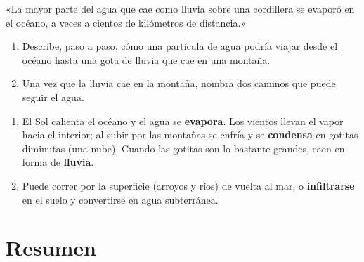 \begin{exercise}
    «La mayor parte del agua que cae como lluvia sobre una cordillera se evaporó en el océano, a veces a cientos de kilómetros de distancia.»
    \begin{enumerate}[label=\letraminuscula]
        \item Describe, paso a paso, cómo una partícula de agua podría viajar desde el océano hasta una gota de lluvia que cae en una montaña.
        \item Una vez que la lluvia cae en la montaña, nombra dos caminos que puede seguir el agua.
    \end{enumerate}
    \begin{solu}
        \begin{enumerate}[label=\alph*)]
            \item El Sol calienta el océano y el agua se \textbf{evapora}. Los vientos llevan el vapor hacia el interior; al subir por las montañas se enfría y se \textbf{condensa} en gotitas diminutas (una nube). Cuando las gotitas son lo bastante grandes, caen en forma de \textbf{lluvia}.
            \item Puede correr por la superficie (arroyos y ríos) de vuelta al mar, o \textbf{infiltrarse} en el suelo y convertirse en agua subterránea.
        \end{enumerate}
    \end{solu}
\end{exercise}


\section*{Resumen}

